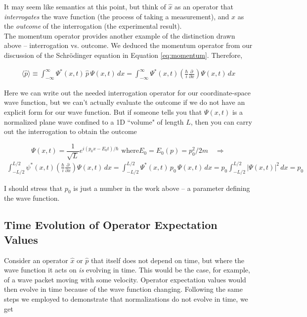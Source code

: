 It may seem like semantics at this point, but think of $\hat{x}$ as an operator
that \textit{interrogates} the wave function (the process of taking
a measurement), and $x$ as the \textit{outcome} of the interrogation (the
experimental result). \\

The momentum operator provides another example of the distinction drawn above
-- interrogation vs. outcome. We deduced the momentum operator from our
discussion of the Schr\"odinger equation in Equation \ref{eq:momentum}.
Therefore, 

\begin{align} \label{}
  \langle \hat{p} \rangle \equiv \int_{-\infty}^{\infty} \Psi^*(x, t)
  \,\hat{p}\, \Psi(x, t) \, dx = \int_{-\infty}^{\infty} \Psi^*(x, t) \left(
  \frac{\hbar}{i} \frac{\partial }{\partial x}  \right) \Psi(x, t) \, dx
\end{align}\vspace{3px}


Here we can write out the needed interrogation operator for our
coordinate-space wave function, but we can't actually evaluate the outcome if
we do not have an explicit form for our wave function. But if someone tells you
that $\Psi(x, t)$ is a normalized plane wave confined to a 1D ``volume" of
length $L$, then you can carry out the interrogation to obtain the outcome

\[ \Psi(x, t) = \frac{1}{\sqrt{L}}e^{i(p_0  x - E_0 t)/\hbar} \text{ where
}  E_0 = E_0(p) = p_0^2 / 2m \quad \Rightarrow \]
\begin{align*}
  \int_{-L/2}^{L/2} \psi^*(x, t) \left( \frac{\hbar}{i} \frac{\partial
  }{\partial x}  \right) \Psi(x, t) \, dx = \int_{-L/2}^{L/2} \Psi^*(x, t) \,
  p_0 \, \Psi(x,t) \, dx = p_0 \int_{-L/2}^{L/2} |\Psi(x, t)|^2 \, dx = p_0
\end{align*}\vspace{3px}

I should stress that $p_0$ is just a number in the work above -- a parameter
defining the wave function. 

\subsection{Time Evolution of Operator Expectation Values}

Consider an operator $\hat{x}$ or $\hat{p}$ that itself does not depend on
time, but where the wave function it acts on \textit{is} evolving in time. This
would be the case, for example, of a wave packet moving with some velocity.
Operator expectation values would then evolve in time because of the wave
function changing. Following the same steps we employed to demonstrate that
normalizations do not evolve in time, we get 

